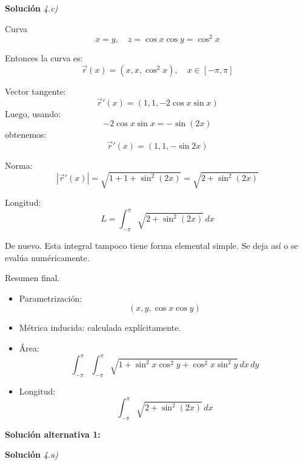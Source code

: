 \documentclass[11pt,spanish]{article}
\begin{document}
\vspace{0.5cm}
{\bf Soluci\'on }{\em 4.c)}
\vspace{0.5cm}

Curva
$$
x = y, \quad z = \cos x \cos y = \cos^2 x
$$

Entonces la curva es:
$$
\vec r(x) = (x, x, \cos^2 x), \quad x \in [-\pi, \pi]
$$

Vector tangente:
$$
\vec r'(x) = (1,1,-2\cos x \sin x)
$$
Luego, usando:
$$
-2\cos x \sin x = -\sin(2x)
$$
obtenemos:
$$
\vec r'(x) = (1,1,-\sin 2x)
$$

Norma:
$$
|\vec r'(x)| = \sqrt{1 + 1 + \sin^2(2x)} = \sqrt{2 + \sin^2(2x)}
$$

Longitud:
$$
\boxed{
L = \int_{-\pi}^{\pi} \sqrt{2 + \sin^2(2x)}\, dx
}
$$

De nuevo.
Esta integral tampoco tiene forma elemental simple. 
Se deja así o se evalúa numéricamente.

Resumen final.
\begin{itemize}
\item Parametrización:
$$
(x,y,\cos x \cos y)
$$

\item Métrica inducida: calculada explícitamente.

\item Área:
$$
\int_{-\pi}^{\pi}\int_{-\pi}^{\pi} \sqrt{1 + \sin^2 x \cos^2 y + \cos^2 x \sin^2 y}\,dx\,dy
$$

\item Longitud:
$$
\int_{-\pi}^{\pi} \sqrt{2 + \sin^2(2x)}\,dx
$$
\end{itemize}

{\bf Soluci\'on alternativa 1:}


\vspace{0.5cm}
{\bf Soluci\'on }{\em 4.a)}
\vspace{0.5cm}
\end{document}

